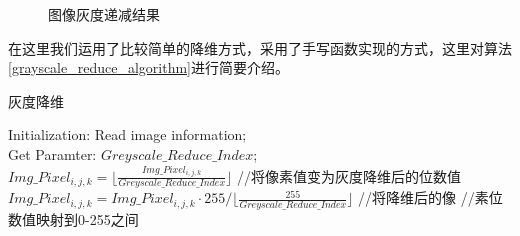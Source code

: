 \documentclass[UTF8]{ctexart}
\begin{document}
\begin{figure}[h!]
	\hspace{0.1in} 
	\hspace{0.1in} 
	\hspace{0.1in} 	
	\caption{图像灰度递减结果} 
	\label{greyscale_reduce_result} %
\end{figure}

在这里我们运用了比较简单的降维方式，采用了手写函数实现的方式，这里对算法\ref{grayscale_reduce_algorithm}进行简要介绍。

\begin{algorithm}[h!]
	\caption{灰度降维}
	\label{grayscale_reduce_algorithm}
	Initialization: Read image information; \\
	Get Paramter: $Greyscale\_Reduce\_Index$; \\
	{
		{
			{
				$Img\_Pixel_{i,j,k} = \biggl\lfloor\frac{Img\_Pixel_{i,j,k}}{Greyscale\_Reduce\_Index}\biggr\rfloor $ //将像素值变为灰度降维后的位数值 \\
				$Img\_Pixel_{i,j,k} = Img\_Pixel_{i,j,k} \cdot  255 / \biggl\lfloor\frac{255}{Greyscale\_Reduce\_Index}\biggr\rfloor  $ //将降维后的像 \newline //素位数值映射到0-255之间
			}
		}
	}
\end{algorithm}
\end{document}
